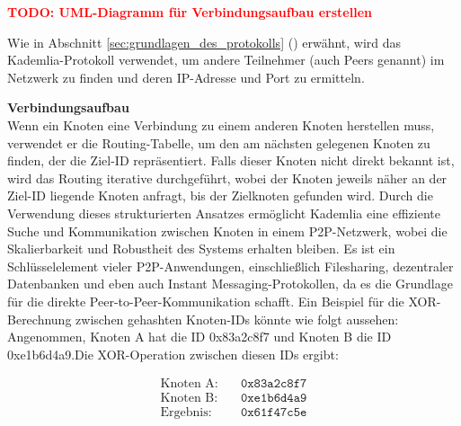 \textbf{\textcolor{red}{TODO: UML-Diagramm für Verbindungsaufbau erstellen}}


\noindent Wie in Abschnitt \ref{sec:grundlagen_des_protokolls} () erwähnt, wird das Kademlia-Protokoll verwendet, um andere Teilnehmer (auch Peers genannt) im Netzwerk zu finden und deren IP-Adresse und Port zu ermitteln. 


\textbf{Verbindungsaufbau} \\
Wenn ein Knoten eine Verbindung zu einem anderen Knoten herstellen muss, verwendet er die Routing-Tabelle, um den am nächsten gelegenen Knoten zu finden, der die Ziel-ID repräsentiert. Falls dieser Knoten nicht direkt bekannt ist, wird das Routing iterative durchgeführt, wobei der Knoten jeweils näher an der Ziel-ID liegende Knoten anfragt, bis der Zielknoten gefunden wird. Durch die Verwendung dieses strukturierten Ansatzes ermöglicht Kademlia eine effiziente Suche und Kommunikation zwischen Knoten in einem P2P-Netzwerk, wobei die Skalierbarkeit und Robustheit des Systems erhalten bleiben. Es ist ein Schlüsselelement vieler P2P-Anwendungen, einschließlich Filesharing, dezentraler Datenbanken und eben auch Instant Messaging-Protokollen, da es die Grundlage für die direkte Peer-to-Peer-Kommunikation schafft. Ein Beispiel für die XOR-Berechnung zwischen gehashten Knoten-IDs könnte wie folgt aussehen:
Angenommen, Knoten A hat die ID 0x83a2c8f7 und Knoten B die ID 0xe1b6d4a9.Die XOR-Operation zwischen diesen IDs ergibt:

\begin{equation}
    \begin{aligned}
        \text{Knoten A:} & \quad \texttt{0x83a2c8f7} \\
        \text{Knoten B:} & \quad \texttt{0xe1b6d4a9} \\
        \text{Ergebnis:} & \quad \texttt{0x61f47c5e}
    \end{aligned}
\end{equation}

